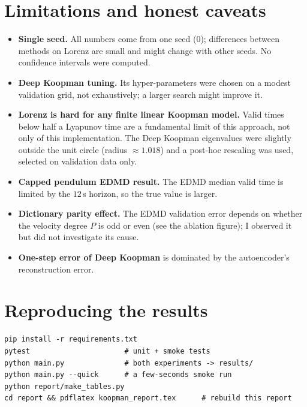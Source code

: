 \documentclass[11pt,a4paper]{article}
\begin{document}
\section{Limitations and honest caveats}

\begin{itemize}
\item \textbf{Single seed.} All numbers come from one seed (0); differences between methods on Lorenz are small and might change
with other seeds. No confidence intervals were computed.
\item \textbf{Deep Koopman tuning.} Its hyper-parameters were chosen on a modest validation grid, not exhaustively; a larger
search might improve it.
\item \textbf{Lorenz is hard for any finite linear Koopman model.} Valid times below half a Lyapunov time are a fundamental
limit of this approach, not only of this implementation. The Deep Koopman eigenvalues were slightly outside the unit circle
(radius $\approx1.018$) and a post-hoc rescaling was used, selected on validation data only.
\item \textbf{Capped pendulum EDMD result.} The EDMD median valid time is limited by the $12\,$s horizon, so the true value is
larger.
\item \textbf{Dictionary parity effect.} The EDMD validation error depends on whether the velocity degree $P$ is odd or even
(see the ablation figure); I observed it but did not investigate its cause.
\item \textbf{One-step error of Deep Koopman} is dominated by the autoencoder's reconstruction error.
\end{itemize}


\section{Reproducing the results}
\begin{verbatim}
pip install -r requirements.txt
pytest                      # unit + smoke tests
python main.py              # both experiments -> results/
python main.py --quick      # a few-seconds smoke run
python report/make_tables.py
cd report && pdflatex koopman_report.tex      # rebuild this report
\end{verbatim}
\end{document}
